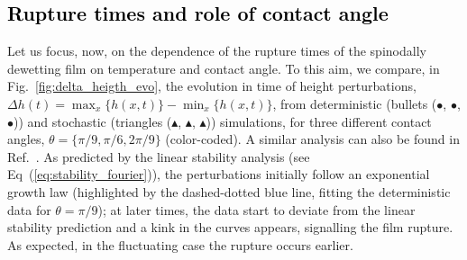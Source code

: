\subsection{\textcolor{black}{Rupture times and role of contact angle}}\label{subsec:results_contact_angle}
Let us focus, now, on the dependence of the rupture times of the spinodally dewetting film on temperature and contact angle. 
To this aim, we compare, in Fig.~\ref{fig:delta_heigth_evo}, the evolution in time of height perturbations, $\Delta h(t) = \max_x\{h(x,t)\} - \min_x\{h(x,t)\}$, from deterministic (bullets (\textcolor{pyblue}{$\bullet$}, \textcolor{pyorange}{$\bullet$}, \textcolor{pygreen}{$\bullet$})) and stochastic (triangles (\textcolor{pyblue}{$\blacktriangle$}, \textcolor{pyorange}{$\blacktriangle$}, \textcolor{pygreen}{$\blacktriangle$})) simulations, for three different contact angles, $\theta = \{ \pi/9, \pi/6, 2\pi/9 \}$ (color-coded).
A similar analysis can also be found in Ref.~\cite{alizadeh_pahlavan_cueto-felgueroso_hosoi_mckinley_juanes_2018}.
As predicted by the linear stability analysis (see Eq~(\ref{eq:stability_fourier})), the perturbations initially follow an exponential growth law (highlighted by the dashed-dotted blue line, fitting the deterministic data for $\theta=\pi/9$);
at later times, the data start to deviate from the linear stability 
prediction and a kink in the curves appears, signalling the film rupture. As expected, in the fluctuating case the rupture occurs earlier. \\
